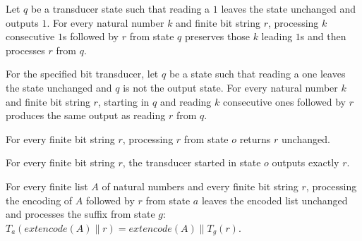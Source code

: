 \begin{theorem}
\label{BoolCircuit.CktSatReduction.T_ones}
\leanok
{}
Let $q$ be a transducer state such that reading a $1$ leaves the state unchanged and
outputs $1$. For every natural number $k$ and finite bit string $r$, processing $k$
consecutive $1$s followed by $r$ from state $q$ preserves those $k$ leading $1$s and
then processes $r$ from $q$.
\end{theorem}

\begin{theorem}
\label{BoolCircuit.CktSatReduction.S_ones}
\leanok
{}
For the specified bit transducer, let $q$ be a state such that reading a one leaves the
state unchanged and $q$ is not the output state. For every natural number $k$ and finite
bit string $r$, starting in $q$ and reading $k$ consecutive ones followed by $r$
produces the same output as reading $r$ from $q$.
\end{theorem}

\begin{theorem}
\label{BoolCircuit.CktSatReduction.T_o}
\leanok
{}
For every finite bit string $r$, processing $r$ from state $o$ returns $r$ unchanged.
\end{theorem}

\begin{theorem}
\label{BoolCircuit.CktSatReduction.S_o}
\leanok
{}
For every finite bit string $r$, the transducer started in state $o$ outputs exactly
$r$.
\end{theorem}

\begin{theorem}
\label{BoolCircuit.CktSatReduction.T_args}
\leanok
{}
For every finite list $A$ of natural numbers and every finite bit string $r$, processing
the encoding of $A$ followed by $r$ from state $a$ leaves the encoded list unchanged and
processes the suffix from state $g$: $T_a(	ext{encode}(A)\rVert r)=	ext{encode}(A)\rVert
T_g(r)$.
\end{theorem}


